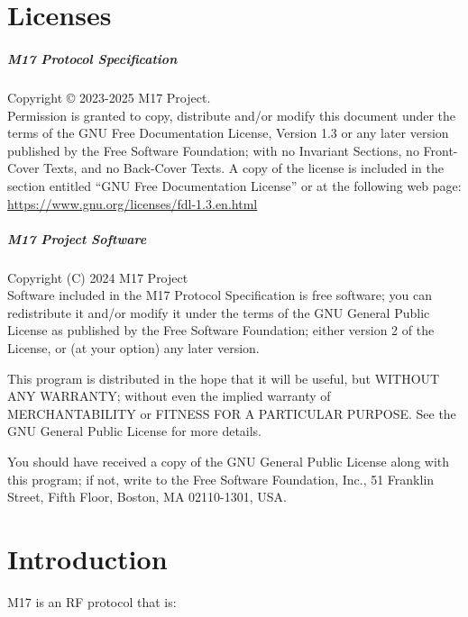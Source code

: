 \documentclass[a4paper,11pt,oneside]{book}
\begin{document}
\chapter{Licenses}

\paragraph{M17 Protocol Specification}

Copyright \copyright{}  2023-2025  M17 Project. \\

Permission is granted to copy, distribute and/or modify this document under the terms of the GNU Free Documentation License, Version 1.3 or any later version published by the Free Software Foundation; with no Invariant Sections, no Front-Cover Texts, and no Back-Cover Texts. A copy of the license is included in the section entitled ``GNU Free Documentation License'' or at the following web page: \href{https://www.gnu.org/licenses/fdl-1.3.en.html}{https://www.gnu.org/licenses/fdl-1.3.en.html}

\paragraph{M17 Project Software}

Copyright (C) 2024  M17 Project \\

Software included in the M17 Protocol Specification is free software; you can redistribute it and/or modify it under the terms of the GNU General Public License as published by the Free Software Foundation; either version 2 of the License, or (at your option) any later version.

This program is distributed in the hope that it will be useful, but WITHOUT ANY WARRANTY; without even the implied warranty of MERCHANTABILITY or FITNESS FOR A PARTICULAR PURPOSE.  See the GNU General Public License for more details.

You should have received a copy of the GNU General Public License along with this program; if not, write to the Free Software Foundation, Inc., 51 Franklin Street, Fifth Floor, Boston, MA  02110-1301, USA.

\chapter{Introduction}

M17 is an RF protocol that is:
\end{document}
